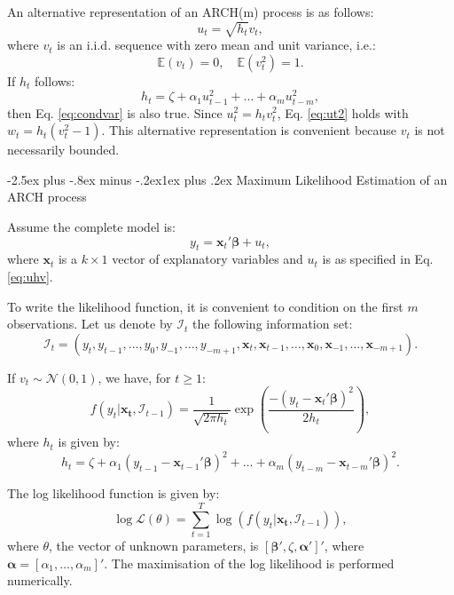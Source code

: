\documentclass[
  11pt,
]{book}
\makeatletter
\renewcommand\subsection{\@startsection{subsection}{2}{\z@}
  {-2.5ex plus -.8ex minus -.2ex}{1ex plus .2ex}
  {\normalfont\large\bfseries\color{TextbookInk}}}
\theoremstyle{definition}
\theoremstyle{definition}
\theoremstyle{definition}
\theoremstyle{definition}
\theoremstyle{remark}
\makeatother
\begin{document}
An alternative representation of an ARCH(m) process is as follows:
\begin{equation}
u_t = \sqrt{h_t}v_t,\label{eq:uhv}
\end{equation}
where \(v_t\) is an i.i.d. sequence with zero mean and unit variance, i.e.:
\[
\mathbb{E}(v_t) = 0, \quad \mathbb{E}(v_t^2) = 1.
\]
If \(h_t\) follows:
\begin{equation}
h_t = \zeta + \alpha_1 u_{t-1}^2 + \dots + \alpha_m u_{t-m}^2,\label{eq:hARCH}
\end{equation}
then Eq. \eqref{eq:condvar} is also true. Since \(u_t^2 = h_t v_t^2\), Eq. \eqref{eq:ut2} holds with \(w_t = h_t (v_t^2-1)\). This alternative representation is convenient because \(v_t\) is not necessarily bounded.

\subsection{Maximum Likelihood Estimation of an ARCH process}\label{maximum-likelihood-estimation-of-an-arch-process}

Assume the complete model is:
\[
y_t = \mathbf{x}_t'\boldsymbol\beta + u_t,
\]
where \(\mathbf{x}_t\) is a \(k \times 1\) vector of explanatory variables and \(u_t\) is as specified in Eq. \eqref{eq:uhv}.

To write the likelihood function, it is convenient to condition on the first \(m\) observations. Let us denote by \(\mathcal{I}_t\) the following information set:
\[
\mathcal{I}_t = (y_t,y_{t-1},\dots,y_0,y_{-1},\dots,y_{-m+1}, \mathbf{x}_t,\mathbf{x}_{t-1},\dots,\mathbf{x}_0,\mathbf{x}_{-1},\dots,\mathbf{x}_{-m+1}).
\]

If \(v_t \sim \mathcal{N}(0,1)\), we have, for \(t\ge1\):
\begin{equation}
f(y_t|\mathbf{x_t},\mathcal{I}_{t-1}) = \frac{1}{\sqrt{2 \pi h_t}}\exp\left(\frac{-(y_t-\mathbf{x}_t'\boldsymbol\beta)^2}{2h_t}\right),\label{eq:densityN}
\end{equation}
where \(h_t\) is given by:
\[
h_t = \zeta + \alpha_1 (y_{t-1} - \mathbf{x}_{t-1}'\boldsymbol\beta)^2 + \dots + \alpha_m (y_{t-m} - \mathbf{x}_{t-m}'\boldsymbol\beta)^2.
\]

The log likelihood function is given by:
\[
\log \mathcal{L}(\theta) = \sum_{t=1}^T \log(f(y_t|\mathbf{x_t},\mathcal{I}_{t-1})),
\]
where \(\theta\), the vector of unknown parameters, is \([\boldsymbol\beta',\zeta,\boldsymbol\alpha']'\), where \(\boldsymbol\alpha=[\alpha_1,\dots,\alpha_m]'\). The maximisation of the log likelihood is performed numerically.
\end{document}
